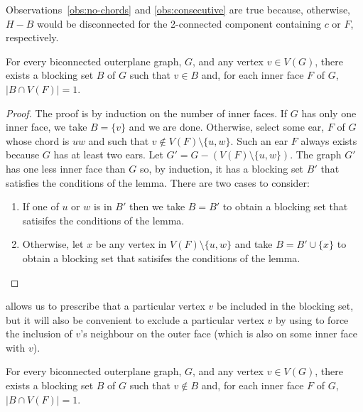 \documentclass{patmorin}
\begin{document}
Observations~\ref{obs:no-chords} and \ref{obs:consecutive} are true
because, otherwise, $H-B$ would be disconnected for the 2-connected
component containing $c$ or $F$, respectively.



\begin{lem}
  For every biconnected outerplane graph, $G$, and any vertex $v\in
  V(G)$, there exists a blocking set $B$ of $G$ such that $v\in B$ and,
  for each inner face $F$ of $G$, $|B\cap V(F)|=1$.
\end{lem}

\begin{proof}
  The proof is by induction on the number of inner faces.  If $G$ has
  only one inner face, we take $B=\{v\}$ and we are done.  Otherwise,
  select some ear, $F$ of $G$ whose chord is $uw$ and such that
  $v\not\in V(F)\setminus\{u,w\}$. Such an ear $F$ always exists because
  $G$ has at least two ears.  Let $G'=G-(V(F)\setminus\{u,w\})$.
  The graph $G'$ has one less inner face than $G$ so, by induction, it
  has a blocking set $B'$ that satisfies the conditions of the lemma.
  There are two cases to consider:
  \begin{enumerate}
    \item If one of $u$ or $w$ is in $B'$ then we take $B=B'$ to obtain
      a blocking set that satisifes the conditions of the lemma.

    \item Otherwise, let $x$ be any vertex in $V(F)\setminus\{u,w\}$ and
      take $B=B'\cup\{x\}$ to obtain a blocking set that satisifes the
      conditions of the lemma. \qedhere
  \end{enumerate}
\end{proof}

 allows us to prescribe that a particular vertex
$v$ be included in the blocking set, but it will also be convenient to
exclude a particular vertex $v$ by using  to force
the inclusion of $v$'s neighbour on the outer face (which is also on
some inner face with $v$).

\begin{cor}
  For every biconnected outerplane graph, $G$, and any vertex $v\in
  V(G)$, there exists a blocking set $B$ of $G$ such that $v\not\in B$ and,
  for each inner face $F$ of $G$, $|B\cap V(F)|=1$.
\end{cor}
\end{document}
